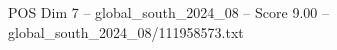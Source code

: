 \begin{textsample}{POS Dim 7 – global\_south\_2024\_08 – Score 9.00 – global\_south\_2024\_08/111958573.txt}
\end{textsample}
